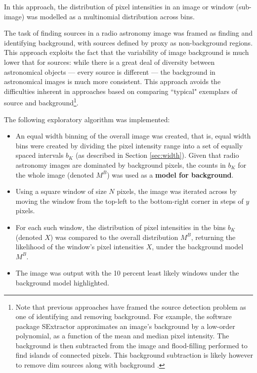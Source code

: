 In this approach, the distribution of pixel intensities in an image or window (sub-image) was modelled as a multinomial distribution \cite{kotz2004continuous,wasserman2004all} across bins.

The task of finding sources in a radio astronomy image was framed as finding and identifying background, with sources defined by proxy as non-background regions. This approach exploits the fact that the variability of image background is much lower that for sources: while there is a great deal of diversity between astronomical objects --- every source is different --- the background in astronomical images is much more consistent. This approach avoids the difficulties inherent in approaches based on comparing ``typical" exemplars of source and background\footnote{Note that previous approaches have framed the source detection problem as one of identifying and removing background. For example, the software package SExtractor \cite{bertin1996sextractor} approximates an image's background by a low-order polynomial, as a function of the mean and median pixel intensity. The background is then subtracted from the image and flood-filling performed to find islands of connected pixels. This background subtraction is likely however to remove dim sources along with background \cite{carvalho2009fast}.}.

The following exploratory algorithm was implemented:
\begin{itemize}
\item An equal width binning of the overall image was created, that is, equal width bins were created by dividing the pixel intensity range into a set of equally spaced intervals $b_K$ (as described in Section \ref{sec:width}). Given that radio astronomy images are dominated by background pixels, the counts in $b_K$ for the whole image (denoted $M^B$) was used as a \textbf{model for background}.
\item Using a square window of size $N$ pixels, the image was iterated across by moving the window from the top-left to the bottom-right corner in steps of $y$ pixels. 
\item For each such window, the distribution of pixel intensities in the bins $b_K$ (denoted $X$) was compared to the overall distribution $M^B$, returning the likelihood of the window's pixel intensities $X$, under the background model $M^B$. 
\item The image was output with the 10 percent least likely windows under the background model highlighted. 
\end{itemize}

